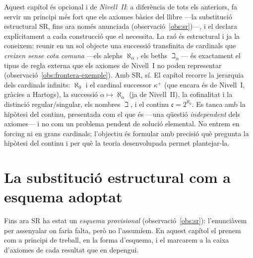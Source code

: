 Aquest capítol és opcional i de \emph{Nivell~II}: a diferència de tots els
anteriors, fa servir un principi més fort que els axiomes bàsics del llibre
---la substitució estructural SR, fins ara només anunciada
(observació~\ref{obs:sr})---, i el declara explícitament a cada construcció que
el necessita. La raó és estructural i ja la coneixem: reunir en un sol objecte
una successió transfinita de cardinals que \emph{creixen sense cota comuna}
---els alephs \(\aleph_\alpha\), els beths \(\beth_\alpha\)--- és exactament el
tipus de regla externa que els axiomes de Nivell~I no poden representar
(observació~\ref{obs:frontera-exemple}). Amb SR, sí. El capítol recorre la
jerarquia dels cardinals infinits: \(\aleph_0\) i el cardinal successor
\(\kappa^{+}\) (que encara és de Nivell~I, gràcies a Hartogs), la successió
\(\alpha\mapsto\aleph_\alpha\) (ja de Nivell~II), la cofinalitat i la distinció
regular\slash singular, els nombres \(\beth\), i el continu
\(\mathfrak c=2^{\aleph_0}\). Es tanca amb la hipòtesi del continu, presentada
com el que és ---una qüestió \emph{independent} dels axiomes--- i no com un
problema pendent de solució elemental. No entrem en forcing ni en grans
cardinals; l'objectiu és formular amb precisió què pregunta la hipòtesi del
continu i per què la teoria desenvolupada permet plantejar-la.

\section{La substitució estructural com a esquema adoptat}\label{sec:sr-adoptat}

Fins ara SR ha estat un \emph{esquema provisional}
(observació~\ref{obs:sr}): l'enunciàvem per assenyalar on faria falta, però no
l'assumíem. En aquest capítol el prenem com a principi de treball, en la forma
d'esquema, i el marcarem a la caixa d'axiomes de cada resultat que en depengui.

